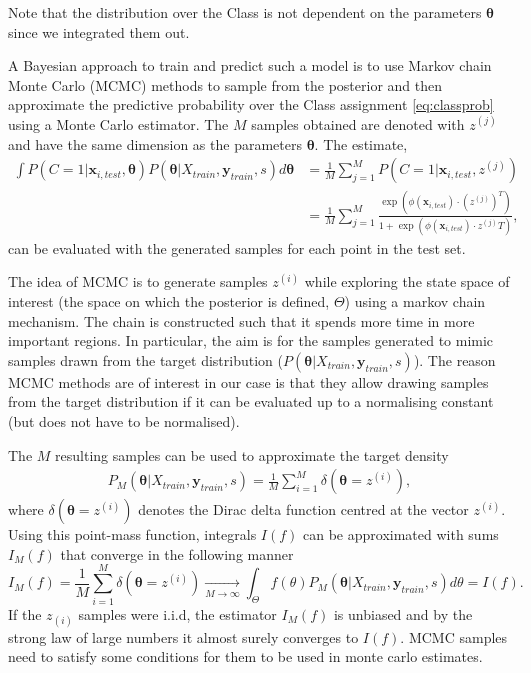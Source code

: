    Note that the distribution over the Class is not dependent on the parameters $\bm{\theta}$ since we integrated them out.
   
   A Bayesian approach to train and predict such a model is to use Markov chain Monte Carlo (MCMC) methods to sample from the posterior and then approximate the predictive probability over the Class assignment \eqref{eq:classprob} using a Monte Carlo estimator. The $M$ samples obtained are denoted with $z^{(j)}$ and have the same dimension as the parameters $\bm{\theta}$. The estimate,
   \begin{align}
   	\int P(C=1|\mathbf{x}_{i,test},\bm{\theta}) P(\bm{\theta}|X_{train},\mathbf{y}_{train},s) d\bm{\theta} &= \frac{1}{M}\sum_{j=1}^M P(C=1|\mathbf{x}_{i,test},z^{(j)}) \\
   	&= \frac{1}{M}\sum_{j=1}^M  \frac{\exp(\phi(\mathbf{x}_{i,test}) \cdot(z^{(j)})^T)}{1+\exp(\phi( \mathbf{x}_{i,test}) \cdot z^{(j)}T)},
   \end{align} 
   can be evaluated with the generated samples for each point in the test set.
   
   
   The idea of MCMC is to generate samples $z^{(i)}$ while exploring the state space of interest (the space on which the posterior is defined, $\Theta$) using a markov chain mechanism. The chain is constructed such that it spends more time in more important regions. In particular, the aim is for the samples generated to mimic samples drawn from the target distribution ($P(\bm{\theta}|X_{train},\mathbf{y}_{train},s)$).
   The reason MCMC methods are of interest in our case is that they allow drawing samples from the target distribution if it can be evaluated up to a normalising constant (but does not have to be normalised). 
   
   The $M$ resulting samples can be used to approximate the target density 
   \begin{align}
   	P_M(\bm{\theta}|X_{train},\mathbf{y}_{train},s) = \frac{1}{M}\sum_{i = 1}^M \delta(\bm{\theta} = z^{(i)}),
   \end{align}
   where $\delta(\bm{\theta} = z^{(i)})$ denotes the Dirac delta function centred at the vector $z^{(i)}$. Using this point-mass function, integrals $I(f)$ can be approximated with sums $I_M(f)$ that converge in the following manner
   \begin{equation}
   	I_M(f) = \frac{1}{M}\sum_{i = 1}^M \delta(\bm{\theta} = z^{(i)})      \underset{M \rightarrow \infty}{{\rightarrow}} \int_{\Theta} f(\theta)P_M(\bm{\theta}|X_{train},\mathbf{y}_{train},s) d\theta = I(f).
   	\label{eq:convergencemcmc}
   \end{equation}
   If the $z_{(i)}$ samples were i.i.d, the estimator $I_M(f)$ is unbiased and by the strong law of large numbers it almost surely converges to $I(f)$. MCMC samples need to satisfy some conditions for them to be used in monte carlo estimates.
   
